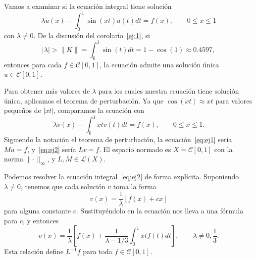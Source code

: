\begin{ejemplo}
	Vamos a examinar si la ecuación integral tiene solución
	\begin{equation}\label{eq:ej1}
		\lambda u(x) - \int_{0}^{1}\sin(xt)u(t)dt = f(x), \qquad 0 \leqslant x \leqslant 1
	\end{equation}
	con $\lambda \neq 0$. De la discusión del corolario~\eqref{ej:1}, si
	\begin{equation}\label{ej:2}
		|\lambda| > \lVert K \rVert = \int_{0}^{1}\sin(t)dt = 1 - \cos (1) \approx 0.4597,
	\end{equation}
	entonces para cada $f \in \mathcal{C}[0,1]$, la ecuación admite una solución única $u \in \mathcal{C}[0,1]$.
	
	Para obtener más valores de $\lambda$ para los cuales nuestra ecuación tiene solución única, aplicamos el teorema de perturbación. Ya que $\cos(xt) \approx xt$ para valores pequeños de $|xt|$, comparamos la ecuación con
	\begin{equation}\label{eq:ej2}
		\lambda v(x) - \int_{0}^{1} xtv(t)dt = f(x), \qquad 0 \leqslant x \leqslant 1.
	\end{equation}
	Siguiendo la notación el teorema de perturbación, la ecuación~\eqref{eq:ej1} sería $Mu = f$, y~\eqref{eq:ej2} sería $Lv = f$. El espacio normado es $X = \mathcal{C}[0,1]$ con la norma $\lVert \cdot \rVert_\infty$, y $L,M \in \mathcal{L}(X)$.
	
	Podemos resolver la ecuación integral~\eqref{eq:ej2} de forma explícita. Suponiendo $\lambda \neq 0$, tenemos que cada solución $v$ toma la forma
	\begin{equation}
		v(x) = \dfrac{1}{\lambda}[f(x)+cx]
	\end{equation}
	para alguna constante $c$. Sustituyéndolo en la ecuación nos lleva a una fórmula para $c$, y entonces
	\begin{equation}
		v(x) = \dfrac{1}{\lambda}[f(x) + \dfrac{1}{\lambda - 1/3}\int_{0}^{1}xtf(t)dt], \qquad \lambda \neq 0,\dfrac{1}{3}.
	\end{equation}
	Esta relación define $L^{-1}f$ para toda $f \in \mathcal{C}[0,1]$.
	

\end{ejemplo}
